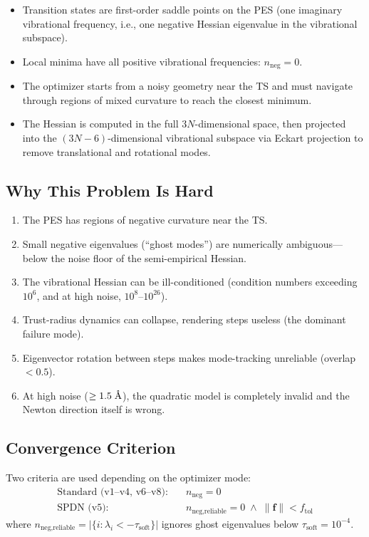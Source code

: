\documentclass[11pt,a4paper]{article}
\newcommand{\vect}[1]{\mathbf{#1}}
\newcommand{\eval}{\lambda}
\newcommand{\angstrom}{\text{\r{A}}}
\begin{document}
\begin{itemize}
  \item Transition states are first-order saddle points on the PES (one imaginary vibrational frequency, i.e., one negative Hessian eigenvalue in the vibrational subspace).
  \item Local minima have all positive vibrational frequencies: $n_\text{neg} = 0$.
  \item The optimizer starts from a noisy geometry near the TS and must navigate through regions of mixed curvature to reach the closest minimum.
  \item The Hessian is computed in the full $3N$-dimensional space, then projected into the $(3N-6)$-dimensional vibrational subspace via Eckart projection to remove translational and rotational modes.
\end{itemize}

\subsection{Why This Problem Is Hard}

\begin{enumerate}
  \item The PES has regions of negative curvature near the TS.
  \item Small negative eigenvalues (``ghost modes'') are numerically ambiguous---below the noise floor of the semi-empirical Hessian.
  \item The vibrational Hessian can be ill-conditioned (condition numbers exceeding $10^6$, and at high noise, $10^{8}$--$10^{26}$).
  \item Trust-radius dynamics can collapse, rendering steps useless (the dominant failure mode).
  \item Eigenvector rotation between steps makes mode-tracking unreliable (overlap $< 0.5$).
  \item At high noise ($\geq 1.5\;\angstrom$), the quadratic model is completely invalid and the Newton direction itself is wrong.
\end{enumerate}

\subsection{Convergence Criterion}

Two criteria are used depending on the optimizer mode:
\begin{align}
  \text{Standard (v1--v4, v6--v8):}&\quad n_\text{neg} = 0 \label{eq:conv-strict} \\
  \text{SPDN (v5):}&\quad n_\text{neg,reliable} = 0 \;\wedge\; \|\vect{f}\| < f_\text{tol} \label{eq:conv-spdn}
\end{align}
where $n_\text{neg,reliable} = |\{i : \eval_i < -\tau_\text{soft}\}|$ ignores ghost eigenvalues below $\tau_\text{soft} = 10^{-4}$.
\end{document}
